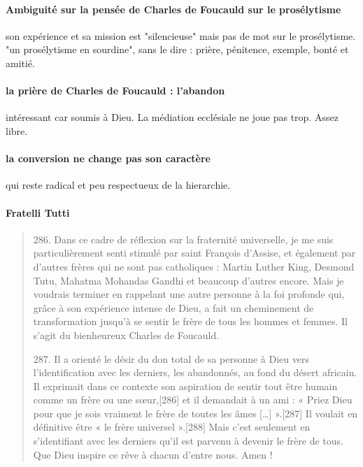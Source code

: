 \paragraph{Ambiguité sur la pensée de Charles de Foucauld sur le prosélytisme} son expérience et sa mission est "silencieuse" mais pas de mot sur le prosélytisme.
"un prosélytisme en sourdine", sans le dire : prière, pénitence, exemple, bonté et amitié. 

\paragraph{la prière de Charles de Foucauld : l'abandon} intéressant car soumis à Dieu. La médiation ecclésiale ne joue pas trop. Assez libre. 

\paragraph{la conversion ne change pas son caractère} qui reste radical et peu respectueux de la hierarchie.

\paragraph{Fratelli Tutti} \begin{quote} 
    286. Dans ce cadre de réflexion sur la fraternité universelle, je me suis particulièrement senti stimulé par saint François d’Assise, et également par d’autres frères qui ne sont pas catholiques : Martin Luther King, Desmond Tutu, Mahatma Mohandas Gandhi et beaucoup d’autres encore. Mais je voudrais terminer en rappelant une autre personne à la foi profonde qui, grâce à son expérience intense de Dieu, a fait un cheminement de transformation jusqu’à se sentir le frère de tous les hommes et femmes. Il s’agit du bienheureux Charles de Foucauld.

287. Il a orienté le désir du don total de sa personne à Dieu vers l’identification avec les derniers, les abandonnés, au fond du désert africain. Il exprimait dans ce contexte son aspiration de sentir tout être humain comme un frère ou une sœur,[286] et il demandait à un ami : « Priez Dieu pour que je sois vraiment le frère de toutes les âmes […] ».[287] Il voulait en définitive être « le frère universel ».[288] Mais c’est seulement en s’identifiant avec les derniers qu’il est parvenu à devenir le frère de tous. Que Dieu inspire ce rêve à chacun d’entre nous. Amen !
\end{quote}


